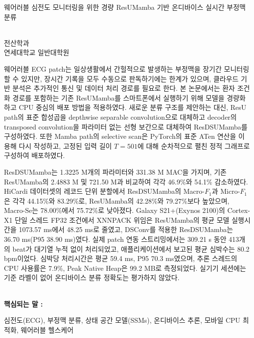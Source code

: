 \begin{abstract_in_korean}
 
\begin{center}
{\LARGE 웨어러블 심전도 모니터링을 위한 경량 ResUMamba 기반 온디바이스 실시간 부정맥 분류}
\end{center}
 
\begin{flushright}
\parbox[t]{0.9\textwidth}
{
\begin{flushright}
{\bf \txtAuthor}\\
전산학과\\
연세대학교 일반대학원
\end{flushright}
}
\end{flushright}
\vspace{1em}
 
웨어러블 ECG patch는 일상생활에서 간헐적으로 발생하는 부정맥을 장기간 모니터링할 수 있지만, 장시간 기록을 모두 수동으로 판독하기에는 한계가 있으며, 클라우드 기반 분석은 추가적인 통신 및 데이터 처리 경로를 필요로 한다. 본 논문에서는 환자 조건화 경로를 포함하는 기존 ResUMamba를 스마트폰에서 실행하기 위해 모델을 경량화하고 CPU 중심의 배포 방법을 적용하였다. 새로운 분류 구조를 제안하는 대신, ResU path의 표준 합성곱을 depthwise separable convolution으로 대체하고 decoder의 transposed convolution을 파라미터 없는 선형 보간으로 대체하여 ResDSUMamba를 구성하였다. 또한 Mamba path의 selective scan은 PyTorch의 표준 ATen 연산을 이용해 다시 작성하고, 고정된 입력 길이 $T=501$에 대해 순차적으로 펼친 정적 그래프로 구성하여 배포하였다.
 
ResDSUMamba는 1.3225 M개의 파라미터와 331.38 M MAC을 가지며, 기존 ResUMamba의 2.4883 M 및 721.50 M과 비교하여 각각 46.9\%와 54.1\% 감소하였다. HiCardi 데이터셋의 레코드 단위 분할에서 ResDSUMamba의 Macro-$F_1$과 Micro-$F_1$은 각각 44.15\%와 83.29\%로, ResUMamba의 42.28\%와 79.27\%보다 높았으며, Macro-Se는 78.00\%에서 75.72\%로 낮아졌다. Galaxy S21+(Exynos 2100)의 Cortex-X1 단일 스레드 FP32 조건에서 XNNPACK 위임은 ResUMamba의 평균 모델 실행시간을 1073.57 ms에서 48.25 ms로 줄였고, DSConv를 적용한 ResDSUMamba는 36.70 ms(P95 38.90 ms)였다. 실제 patch 연동 스트리밍에서는 309.21 s 동안 413개의 beat가 대기열 누적 없이 처리되었고, 애플리케이션에서 보고된 평균 심박수는 80.2 bpm이었다. 심박당 처리시간은 평균 59.4 ms, P95 70.3 ms였으며, 추론 스레드의 CPU 사용률은 7.9\%, Peak Native Heap은 99.2 MB로 측정되었다. 실기기 세션에는 기준 라벨이 없어 온디바이스 분류 정확도는 평가하지 않았다.
 
 \noindent
\hrulefill\\
{\bf 핵심되는 말 : }
\parbox[t]{0.8\textwidth}
{심전도(ECG), 부정맥 분류, 상태 공간 모델(SSMs), 온디바이스 추론, 모바일 CPU 최적화, 웨어러블 헬스케어}
 
\end{abstract_in_korean}
\clearpage
